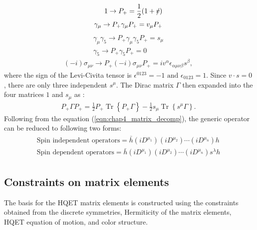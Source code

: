 \begin{eqnarray}\label{trans1}
1\rightarrow P_{+} = \dfrac{1}{2}(1+\slashed{v})\nonumber\\ \gamma_{\mu} \rightarrow P_{+}\gamma_{\mu}P_{+}=v_{\mu}P_{+}
\end{eqnarray}
\vspace{-2cm}
\begin{eqnarray}\label{trans2}
\gamma_{\mu}\gamma_{5}\rightarrow P_{+}\gamma_{\mu}\gamma_{5}P_{+}=s_{\mu}\nonumber\\\gamma_{5}\rightarrow P_{+}\gamma_{5}P_{+}=0
\end{eqnarray}
\vspace{-2cm}
\begin{eqnarray}\label{trans3}
(-i)\sigma_{\mu\nu}\rightarrow P_{+}(-i)\sigma_{\mu\nu}P_{+}=iv^{\alpha}\epsilon_{\alpha\mu\nu\beta}s^{\beta},
\end{eqnarray}
where the sign of the Levi-Civita tensor is $\epsilon^{0123}=-1 \text { and } \epsilon_{0123}=1$. Since $v\cdot s=0$, there are only three independent $s^{\mu}$.  
The Dirac matrix $\Gamma$ then expanded into the four matrices $1$ and $s_{\mu}$ as \cite{Mannel:1994kv}:
\begin{eqnarray}\label{eqn:chap4_matrix_decomp}
P_{+} \Gamma P_{+}=\frac{1}{2} P_{+} \operatorname{Tr}\left\{P_{+} \Gamma\right\}-\frac{1}{2} s_{\mu} \operatorname{Tr}\left\{s^{\mu} \Gamma\right\}.
\end{eqnarray}
Following from the equation (\ref{eqn:chap4_matrix_decomp}), the generic operator can be reduced to following two forms:
\begin{eqnarray}
\begin{array}{c}
{\text{Spin independent operators}=\bar{h}\left(i D^{\mu_{1}}\right)\left(i D^{\mu_{2}}\right) \cdots\left(i D^{\mu_{n}}\right) h} \\
{\text{Spin dependent operators}=\bar{h}\left(i D^{\mu_{1}}\right)\left(i D^{\mu_{2}}\right) \cdots\left(i D^{\mu_{n}}\right) s^{\lambda} h}
\end{array}
\end{eqnarray}
\vspace{-0.8cm}
\subsection{Constraints on matrix elements}\label{subsec:constr_mat}
The basis for the HQET matrix elements is constructed using the constraints obtained from the discrete symmetries, Hermiticity of the matrix elements, HQET equation of motion, and color structure.
\vspace{-0.5cm}
